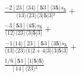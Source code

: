 \documentclass[varwidth, border=5pt]{standalone}
\begin{document}
\begin{my}
$\begin{gathered}
\scriptscriptstyle\frac{-2[23]⟨34⟩[𝟓3]⟨3𝟓⟩s_{𝟓}}{⟨13⟩⟨23⟩⟨3|𝟓|3]²} +\\
\scriptscriptstyle\frac{-3[𝟓3]⟨4𝟓⟩s_{𝟓}}{⟨12⟩⟨23⟩⟨3|𝟓|3]} +\\
\scriptscriptstyle\frac{-1⟨14⟩[23][𝟓3]⟨3𝟓⟩s_{𝟓}}{⟨13⟩⟨23⟩⟨1|2+4|3]⟨3|𝟓|3]} +\\
\scriptscriptstyle\frac{1/6[𝟓1][1|𝟓|𝟓⟩}{[14]⟨23⟩²} \phantom{+}
\end{gathered}$
\end{my}
\end{document}
